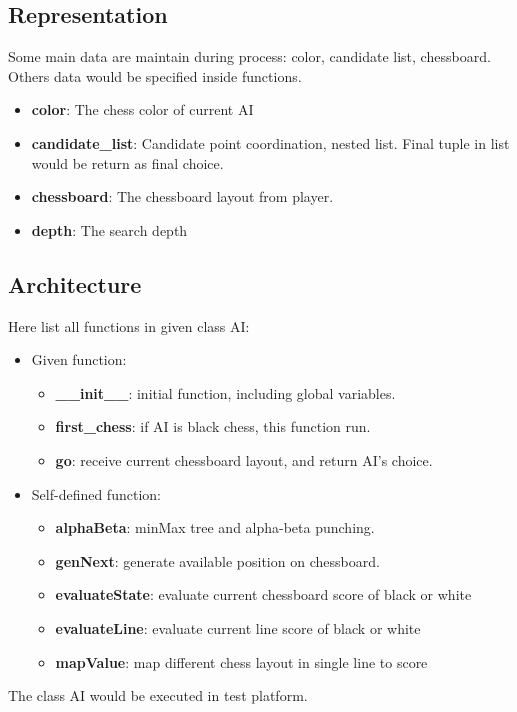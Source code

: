\documentclass[conference,compsoc]{IEEEtran}
\begin{document}
\subsection{Representation}
Some main data are maintain during process: color, candidate list, chessboard.
Others data would be specified inside functions.

\begin{itemize}
  \item \textbf{color}: The chess color of current AI
  \item \textbf{candidate\_list}: Candidate point coordination, nested list.
  Final tuple in list would be return as final choice.
  \item \textbf{chessboard}: The chessboard  layout from player.
  \item \textbf{depth}: The search depth
\end{itemize}


\subsection{Architecture}
Here list all functions in given class AI:
\begin{itemize}
  \item Given function:
  \begin{itemize}
    \item \textbf{\_\_init\_\_}: initial function, including global variables.
    \item \textbf{first\_chess}: if AI is black chess, this function run.
    \item \textbf{go}: receive current chessboard layout, and return AI's choice.
  \end{itemize}
  \item Self-defined function:
    \begin{itemize}
      \item \textbf{alphaBeta}: minMax tree and alpha-beta punching.
      \item \textbf{genNext}: generate available position on chessboard.
      \item \textbf{evaluateState}: evaluate current chessboard score of black
	      or white
      \item \textbf{evaluateLine}: evaluate current line score of black or white
      \item \textbf{mapValue}: map different chess layout in single line to score
    \end{itemize}
\end{itemize}
The class AI would be executed in test platform.
\end{document}
